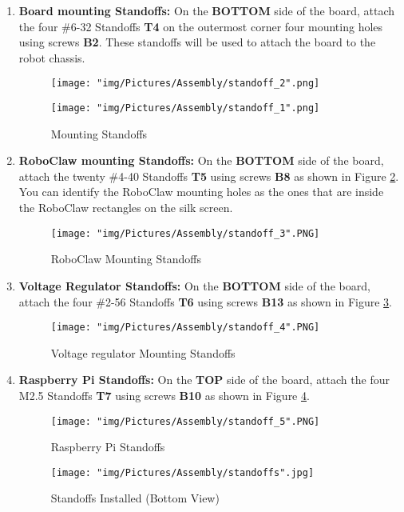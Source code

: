 \documentclass{article}
\begin{document}
\begin{enumerate}
\item \textbf{Board mounting Standoffs:} On the \textbf{BOTTOM} side of the board, attach the four \#6-32 Standoffs \textbf{T4} on the outermost corner four mounting holes using screws \textbf{B2}.  These standoffs will be used to attach the board to the robot chassis.

\begin{figure}[H]
  \centering
  \begin{minipage}[b]{0.45\textwidth}
    \texttt{[image: "img/Pictures/Assembly/standoff\_2".png]}
  \end{minipage}
  \hfill
  \begin{minipage}[b]{0.45\textwidth}
    \texttt{[image: "img/Pictures/Assembly/standoff\_1".png]}
  \end{minipage}
  \caption{Mounting Standoffs}
  \label{standoffs_1}
\end{figure}

\item \textbf{RoboClaw mounting Standoffs:} On the \textbf{BOTTOM} side of the board, attach the twenty \#4-40 Standoffs \textbf{T5} using screws \textbf{B8} as shown in Figure \ref{standoffs_2}. You can identify the RoboClaw mounting holes as the ones that are inside the RoboClaw rectangles on the silk screen.


\begin{figure}[H]
	\centering
	\texttt{[image: "img/Pictures/Assembly/standoff\_3".PNG]}
  \caption{RoboClaw Mounting Standoffs}
  \label{standoffs_2}
\end{figure}

\item \textbf{Voltage Regulator Standoffs:} On the \textbf{BOTTOM} side of the board, attach the four \#2-56 Standoffs \textbf{T6} using screws \textbf{B13} as shown in Figure \ref{standoffs_3}. 

\begin{figure}[H]
	\centering
	\texttt{[image: "img/Pictures/Assembly/standoff\_4".PNG]}
  \caption{Voltage regulator Mounting Standoffs}
  \label{standoffs_3}
\end{figure}

\item \textbf{Raspberry Pi  Standoffs:} On the \textbf{TOP} side of the board, attach the four M2.5 Standoffs \textbf{T7} using screws \textbf{B10} as shown in Figure \ref{standoffs_4}. 

\begin{figure}[H]
	\centering
	\texttt{[image: "img/Pictures/Assembly/standoff\_5".PNG]}
  \caption{Raspberry Pi Standoffs}
  \label{standoffs_4}
\end{figure}

\begin{figure}[H]
	\centering
	\texttt{[image: "img/Pictures/Assembly/standoffs".jpg]}
	\caption{Standoffs Installed (Bottom View)}
\end{figure}


\end{enumerate}
\end{document}

